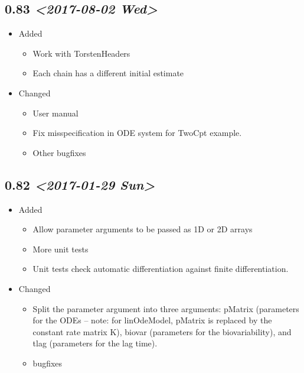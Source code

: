 \documentclass[11pt, reqno]{amsbook}
\numberwithin{section}{chapter}
\theoremstyle{remark}
\begin{document}
\subsection*{0.83 \textit{<2017-08-02 Wed>}}
\label{sec:orge30c9ba}
\begin{itemize}
\item Added
\label{sec:orgd33cec0}
\begin{itemize}
\item Work with TorstenHeaders
\item Each chain has a different initial estimate
\end{itemize}

\item Changed
\label{sec:orgc9dc5b4}
\begin{itemize}
\item User manual
\item Fix misspecification in ODE system for TwoCpt example.
\item Other bugfixes
\end{itemize}
\end{itemize}


\subsection*{0.82 \textit{<2017-01-29 Sun>}}
\label{sec:orgc2f55bc}
\begin{itemize}
\item Added
\label{sec:orgc8a44cb}
\begin{itemize}
\item Allow parameter arguments to be passed as 1D or 2D arrays
\item More unit tests
\item Unit tests check automatic differentiation against finite differentiation.
\end{itemize}

\item Changed
\label{sec:org05b6a3e}
\begin{itemize}
\item Split the parameter argument into three arguments: pMatrix
(parameters for the ODEs -- note: for linOdeModel, pMatrix
is replaced by the constant rate matrix K), biovar
(parameters for the biovariability), and tlag (parameters
for the lag time).
\item bugfixes
\end{itemize}
\end{itemize}
\end{document}
